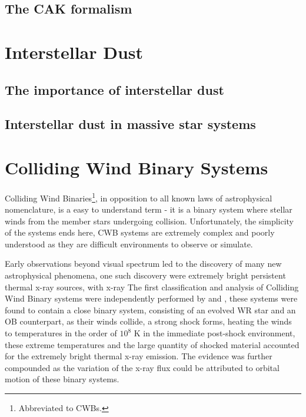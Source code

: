 \subsection{The CAK formalism}
\label{sec:cak}

\section{Interstellar Dust}
\label{sec:dust}

\subsection{The importance of interstellar dust}
\label{sec:dustimportance}

\subsection{Interstellar dust in massive star systems}
\label{sec:dustmassivestars}

\section{Colliding Wind Binary Systems}
\label{sec:cwb}



Colliding Wind Binaries\footnote{Abbreviated to CWBs.}, in opposition to all known laws of astrophysical nomenclature, is a easy to understand term - it is a binary system where stellar winds from the member stars undergoing collision.
Unfortunately, the simplicity of the systems ends here, CWB systems are extremely complex and poorly understood as they are difficult environments to observe or simulate.


Early observations beyond visual spectrum led to the discovery of many new astrophysical phenomena, one such discovery were extremely bright persistent thermal x-ray sources, with x-ray 
The first classification and analysis of Colliding Wind Binary systems were independently performed by \cite{prilutskii_x_1976} and \cite{cherepashchukDetectabilityWolfRayetBinaries1976}, these systems were found to contain a close binary system, consisting of an evolved WR star and an OB counterpart, as their winds collide, a strong shock forms, heating the winds to temperatures in the order of $10^8$ \si{\kelvin} in the immediate post-shock environment, these extreme temperatures and the large quantity of shocked material accounted for the extremely bright thermal x-ray emission. The evidence was further compounded as the variation of the x-ray flux could be attributed to orbital motion of these binary systems.

